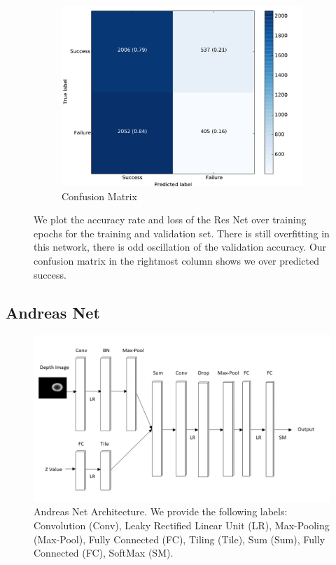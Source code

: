 \begin{figure}[t!]
\begin{subfigure}[t]{0.32\textwidth}
        \includegraphics[width=0.8\columnwidth]{figs/confusion_resnet.pdf}
        \caption{Confusion Matrix} \label{fig:confusion_res}
    \end{subfigure}
\caption{We plot the accuracy rate and loss of the Res Net over training epochs for the training and validation set. There is still overfitting in this network, there is odd oscillation of the validation accuracy. Our confusion matrix in the rightmost column shows we over predicted success.} \label{fig:resnet_results}
\end{figure}

\subsection{Andreas Net}

\begin{figure}[t!]
    \includegraphics[width=0.99\columnwidth]{figs/andreas_net.png}
\caption{Andreas Net Architecture. We provide the following labels: Convolution (Conv), Leaky Rectified Linear Unit (LR), Max-Pooling (Max-Pool),  Fully Connected (FC), Tiling (Tile), Sum (Sum), Fully Connected (FC), SoftMax (SM).} \label{fig:andreas_net}
\end{figure}

